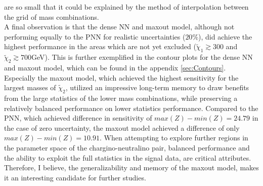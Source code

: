 are so small that it could be explained by the method of interpolation between the grid of mass combinations.
\\
A final observation is that the dense \ac{NN} and maxout model, although not performing equally to the \ac{PNN} for realistic uncertainties ($20\%$), did achieve the highest performance in 
the areas which are not yet excluded ($\tilde{\chi}_1\gtrsim300$ and $\tilde{\chi}_2\gtrsim700$GeV). This is further exemplified in the contour plots for the dense \ac{NN} and maxout model, which 
can be found in the appendix \ref{sec:Contours}. Especially the maxout model, which achieved the highest sensitivity for the largest 
masses of $\tilde{\chi}_2$, utilized an impressive long-term memory to draw benefits from the large statistics of the lower mass combinations, while preserving a relatively balanced performance on 
lower statistics performance. Compared to the \ac{PNN}, which achieved difference in sensitivity of $max(Z)-min(Z) = 24.79$ in the case of zero uncertainty, the maxout model achieved a difference 
of only $max(Z)-min(Z) = 10.91$. When attempting to explore further regions in the parameter space of the chargino-neutralino pair, balanced performance and the ability to exploit the full statistics in the 
signal data, are critical attributes. Therefore, I believe, the generalizability and memory of the maxout model, makes it an interesting candidate for further studies.
\newpage
